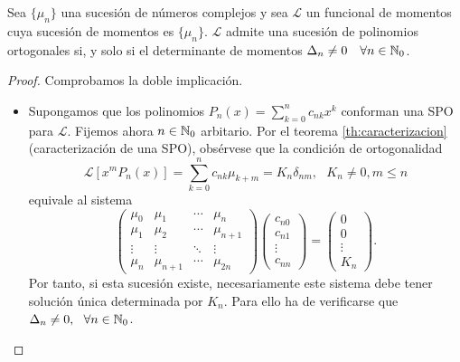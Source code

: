 \begin{teorema}
    Sea $\{\mu_n\}$ una sucesión de números complejos y sea $\mathcal{L}$ un funcional de momentos cuya sucesión de momentos es $\{\mu_n\}$. $\mathcal L$ admite una sucesión de polinomios ortogonales si, y solo si el determinante de momentos $\Delta_n\neq 0\ \ \ \forall n\in\N_0$. 
\end{teorema}
\begin{proof} Comprobamos la doble implicación.

    \begin{itemize}
        \item[\fbox{$\Rightarrow$}] Supongamos que los polinomios $P_n(x) = \sum_{k=0}^n c_{nk}x^k$ conforman una SPO para $\mathcal L$. Fijemos ahora $n\in\mathbb{N}_0$ arbitario. Por el teorema \ref{th:caracterizacion} (caracterización de una SPO), obsérvese que la condición de ortogonalidad 
        \begin{equation}
            \label{eq:cond-ort}
            \mathcal{L}[x^m P_n(x)]= \sum_{k=0}^n c_{nk} \mu_{k+m} = K_n\delta_{nm}, \ \ \ K_n\neq 0, m\leq n
        \end{equation}
        equivale al sistema
        \begin{equation}
            \label{eq:sistema-existencia}
            \begin{pmatrix}
                \mu_0 & \mu_1 & \cdots & \mu_n \\
                \mu_1 & \mu_2 & \cdots & \mu_{n+1} \\
                \vdots & \vdots & \ddots & \vdots \\
                \mu_n & \mu_{n+1} & \cdots & \mu_{2n}
            \end{pmatrix} \begin{pmatrix}
                c_{n0} \\ c_{n1} \\ \vdots \\ c_{nn}
            \end{pmatrix} = \begin{pmatrix}
                0 \\ 0 \\ \vdots \\ K_n
            \end{pmatrix}.
        \end{equation}
        Por tanto, si esta sucesión existe, necesariamente este sistema debe tener solución única determinada por $K_n$. Para ello ha de verificarse que $\Delta_n\neq 0, \ \ \forall n\in\mathbb{N}_0$.

\end{itemize}
\end{proof}
